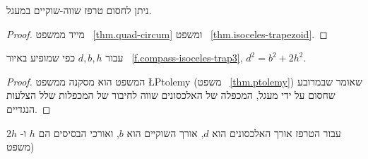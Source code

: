 %
\begin{theorem}
ניתן לחסום טרפז שווה-שוקיים במעגל.
\end{theorem}
\begin{proof}
מייד ממשפט%
~\ref{thm.quad-circum}
ומשפט%
~\ref{thm.isoceles-trapezoid}.
\end{proof}

\begin{theorem}
עבור 
$d,b,h$
כפי שמופיע באיור%
~\ref{f.compass-isoceles-trap3}, $d^2=b^2+2h^2$.
\end{theorem}
\begin{proof}
המשפט הוא מסקנה ממשפט
\L{Ptolemy}
(משפט%
~\ref{thm.ptolemy})
שאומר שבמרובע שחסום על ידי מעגל, המכפלה של האלכסונים שווה לחיבור של המכפלות שלל הצלעות הנגדיים.
\end{proof}

עבור הטרפז אורך האלכסונים הוא
$d$,
אורך השוקיים הוא
$b$,
ואורכי הבסיסים הם
$h$
ו-%
$2h$
(משפט%

